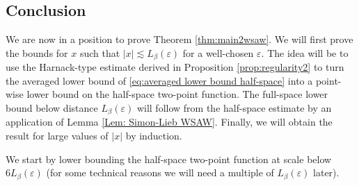 \documentclass[11pt,a4paper]{article}
\numberwithin{equation}{section}
\theoremstyle{plain}
\theoremstyle{definition}
\begin{document}
\subsection{Conclusion}

We are now in a position to prove Theorem \ref{thm:main2wsaw}. We will first prove the bounds for $x$ such that $|x|\lesssim L_\beta(\varepsilon)$  for a well-chosen $\varepsilon$. The idea will be to use the Harnack-type estimate derived in Proposition \ref{prop:regularity2} to turn the averaged lower bound of \eqref{eq:averaged lower bound half-space} into a point-wise lower bound on the half-space two-point function. The full-space lower bound below distance $L_\beta(\varepsilon)$ will follow from the half-space estimate by an application of Lemma \ref{Lem: Simon-Lieb WSAW}. Finally, we will obtain the result for large values of $|x|$ by induction.

We start by lower bounding the half-space two-point function at scale below $6L_\beta(\varepsilon)$ (for some technical reasons we will need a multiple of $L_\beta(\varepsilon)$ later).
\end{document}
